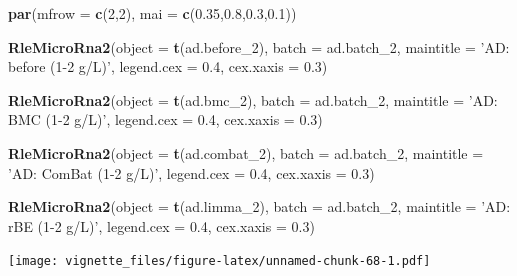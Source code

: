 \documentclass[]{book}
\newenvironment{Shaded}{\begin{snugshade}}{\end{snugshade}}
\newcommand{\KeywordTok}[1]{\textcolor[rgb]{0.13,0.29,0.53}{\textbf{#1}}}
\newcommand{\DataTypeTok}[1]{\textcolor[rgb]{0.13,0.29,0.53}{#1}}
\newcommand{\DecValTok}[1]{\textcolor[rgb]{0.00,0.00,0.81}{#1}}
\newcommand{\FloatTok}[1]{\textcolor[rgb]{0.00,0.00,0.81}{#1}}
\newcommand{\StringTok}[1]{\textcolor[rgb]{0.31,0.60,0.02}{#1}}
\newcommand{\NormalTok}[1]{#1}
\begin{document}
\begin{Shaded}
\begin{Highlighting}[]
\KeywordTok{par}\NormalTok{(}\DataTypeTok{mfrow =} \KeywordTok{c}\NormalTok{(}\DecValTok{2}\NormalTok{,}\DecValTok{2}\NormalTok{), }\DataTypeTok{mai =} \KeywordTok{c}\NormalTok{(}\FloatTok{0.35}\NormalTok{,}\FloatTok{0.8}\NormalTok{,}\FloatTok{0.3}\NormalTok{,}\FloatTok{0.1}\NormalTok{))}

\KeywordTok{RleMicroRna2}\NormalTok{(}\DataTypeTok{object =} \KeywordTok{t}\NormalTok{(ad.before_}\DecValTok{2}\NormalTok{), }\DataTypeTok{batch =}\NormalTok{ ad.batch_}\DecValTok{2}\NormalTok{, }
             \DataTypeTok{maintitle =} \StringTok{'AD: before (1-2 g/L)'}\NormalTok{, }\DataTypeTok{legend.cex =} \FloatTok{0.4}\NormalTok{, }
             \DataTypeTok{cex.xaxis =} \FloatTok{0.3}\NormalTok{)}

\KeywordTok{RleMicroRna2}\NormalTok{(}\DataTypeTok{object =} \KeywordTok{t}\NormalTok{(ad.bmc_}\DecValTok{2}\NormalTok{), }\DataTypeTok{batch =}\NormalTok{ ad.batch_}\DecValTok{2}\NormalTok{, }
             \DataTypeTok{maintitle =} \StringTok{'AD: BMC (1-2 g/L)'}\NormalTok{, }\DataTypeTok{legend.cex =} \FloatTok{0.4}\NormalTok{, }
             \DataTypeTok{cex.xaxis =} \FloatTok{0.3}\NormalTok{)}

\KeywordTok{RleMicroRna2}\NormalTok{(}\DataTypeTok{object =} \KeywordTok{t}\NormalTok{(ad.combat_}\DecValTok{2}\NormalTok{), }\DataTypeTok{batch =}\NormalTok{ ad.batch_}\DecValTok{2}\NormalTok{, }
             \DataTypeTok{maintitle =} \StringTok{'AD: ComBat (1-2 g/L)'}\NormalTok{, }\DataTypeTok{legend.cex =} \FloatTok{0.4}\NormalTok{, }
             \DataTypeTok{cex.xaxis =} \FloatTok{0.3}\NormalTok{)}

\KeywordTok{RleMicroRna2}\NormalTok{(}\DataTypeTok{object =} \KeywordTok{t}\NormalTok{(ad.limma_}\DecValTok{2}\NormalTok{), }\DataTypeTok{batch =}\NormalTok{ ad.batch_}\DecValTok{2}\NormalTok{, }
             \DataTypeTok{maintitle =} \StringTok{'AD: rBE (1-2 g/L)'}\NormalTok{, }\DataTypeTok{legend.cex =} \FloatTok{0.4}\NormalTok{, }
             \DataTypeTok{cex.xaxis =} \FloatTok{0.3}\NormalTok{)}
\end{Highlighting}
\end{Shaded}

\texttt{[image: vignette\_files/figure-latex/unnamed-chunk-68-1.pdf]}
\end{document}
